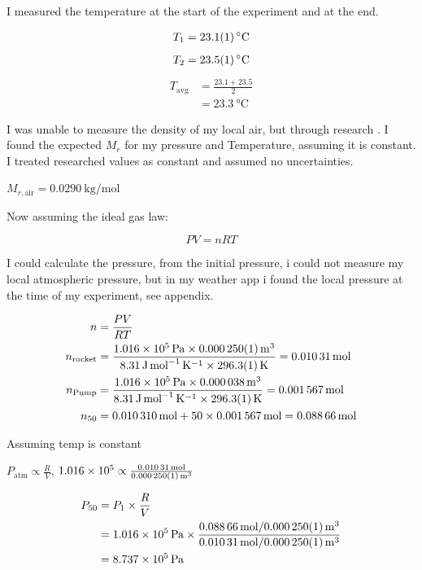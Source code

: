 \documentclass[12pt,a4paper]{article}
\begin{document}
I measured the temperature at the start of the experiment and at the end.

\begin{align}
T_1 &= \SI{23.1 \pm 0.1}{\celsius} \\
\end{align}
\begin{align}
T_2 &= \SI{23.5 \pm 0.1}{\celsius} \\
\end{align}
\begin{align} T_{\text{avg}} &= \frac{23.1 + 23.5}{2} \\
&= \SI{23.3}{\celsius}
\end{align}

I was unable to measure the density of my local air, but through research \cite{ref14}. I found the expected $M_r$ for my pressure and Temperature, assuming it is constant. I treated researched values as constant and assumed no uncertainties.

$M_{r,\text{air}} = \SI{0.0290}{\kilo\gram\per\mol}$

Now assuming the ideal gas law:

\begin{equation}
PV = nRT
\end{equation}

I could calculate the pressure, from the initial pressure, i could not measure my local atmospheric pressure, but in my weather app i found the local pressure at the time of my experiment, see appendix.

\begin{align}
n &= \frac{PV}{RT} \\
n_{\text{rocket}} &= \frac{\SI{1.016e5}{\pascal} \times \SI{0.000250 \pm 0.000001}{\meter\cubed}}{\SI{8.31}{\joule\per\mol\per\kelvin} \times \SI{296.3 \pm 0.1}{\kelvin}} = \SI{0.01031}{\mol} \\
n_{\text{Pump}} &= \frac{\SI{1.016e5}{\pascal} \times \SI{0.000038}{\meter\cubed}}{\SI{8.31}{\joule\per\mol\per\kelvin} \times \SI{296.3 \pm 0.1}{\kelvin}} = \SI{0.001567}{\mol} \\
n_{50} &= \SI{0.010310}{\mol} + 50 \times \SI{0.001567}{\mol} = \SI{0.08866}{\mol}
\end{align}

Assuming temp is constant

$P_{\text{atm}} \propto \frac{R}{V}$, $\SI{1.016e5}{} \propto \frac{\SI{0.01031}{\mol}}{\SI{0.000250 \pm 0.000001}{\meter\cubed}}$

\begin{align}
P_{50} &= P_1 \times \frac{R}{V} \\
&= \SI{1.016e5}{\pascal} \times \frac{\SI{0.08866}{\mol} / \SI{0.000250 \pm 0.000001}{\meter\cubed}}{\SI{0.01031}{\mol} / \SI{0.000250 \pm 0.000001}{\meter\cubed}} \\
&= \SI{8.737e5}{\pascal}
\end{align}
\end{document}

